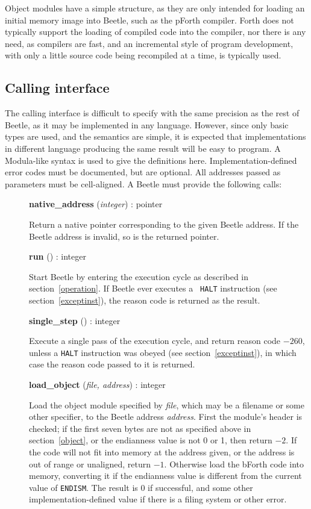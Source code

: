 \documentclass[english]{article}
\newlength{\itemwidth}\itemwidth=\textwidth \advance\itemwidth by -0.1in
\newlength{\innerwidth}\innerwidth=\itemwidth \advance\innerwidth by -0.5in
\newcommand{\iface}[4]{\item[]\parbox{\itemwidth}{{\bf #1} ({\it #2}\/) :
#3\\[0.5ex]\hspace*{0.4in}\parbox{\innerwidth}{#4}}}
\begin{document}
Object modules have a simple structure, as they are only intended for loading an
initial memory image into Beetle, such as the pForth compiler. Forth does not
typically support the loading of compiled code into the compiler, nor there is
any need, as compilers are fast, and an incremental style of program
development, with only a little source code being recompiled at a time, is
typically used.


\subsection{Calling interface}
\label{calls}

The calling interface is difficult to specify with the same precision as the
rest of Beetle, as it may be implemented in any language. However, since only
basic types are used, and the semantics are simple, it is expected that
implementations in different language producing the same result will be easy to
program. A Modula-like syntax is used to give the definitions here.
Implementation-defined error codes must be documented, but are optional. All
addresses passed as parameters must be cell-aligned. A Beetle must provide the
following calls:

\begin{description}
\iface{native\_address}{integer}{pointer}{Return a native pointer corresponding
    to the given Beetle address. If the Beetle address is invalid, so is the returned pointer.}
\iface{run}{}{integer}{Start Beetle by entering the execution cycle as
    described in section~\ref{operation}. If Beetle ever executes a {\tt
    HALT} instruction (see section~\ref{exceptinst}), the reason code is
    returned as the result.}
\iface{single\_step}{}{integer}{Execute a single pass of the execution
    cycle, and return reason code $-260$, unless a {\tt HALT} instruction was
    obeyed (see section~\ref{exceptinst}), in which case the reason code
    passed to it is returned.}
\iface{load\_object}{file, address}{integer}{Load the object module
    specified by \textit{file}, which may be a filename or some other
    specifier, to the Beetle address \textit{address}. First the module's
    header is checked; if the first seven bytes are not as specified above
    in section~\ref{object}, or the endianness value is not 0 or 1, then
    return $-2$. If the code will not fit into memory at the address given, or
    the address is out of range or unaligned, return $-1$. Otherwise load the bForth code into
    memory, converting it if the endianness value is different from the current
    value of {\tt ENDISM}. The result is 0 if successful, and some other
    implementation-defined value if there is a filing system or other error.}
\end{description}
\end{document}
